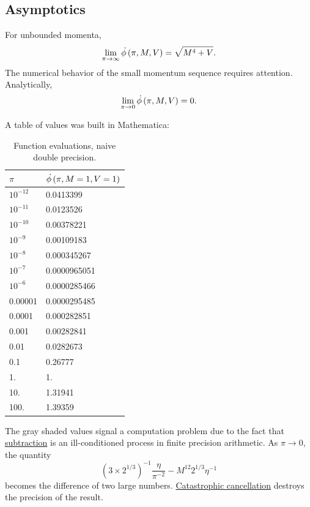 \documentclass[11pt, oneside]{article}   	%
\newcommand{\pd}[0]				   {\skew{6}{\dot}{\phi}}
\newcommand{\phidot}[0]      {\pd\left( \pi, M, V \right)}
\begin{document}
\subsection{Asymptotics}
For unbounded momenta,
  \begin{equation}   %
    \lim_{\pi\to\infty} \phidot = \sqrt{M^{4}+V}.
  \end{equation}
The numerical behavior of the small momentum sequence requires attention. Analytically,
  \begin{equation}   %
    \lim_{\pi\to 0} \phidot = 0.
  \end{equation}

A table of values was built in Mathematica:
\begin{table}[htbp]
  \caption{Function evaluations, naive double precision.}
  \begin{center}
    \begin{tabular}{ll}
       $\pi$ & $\pd\left( \pi, M = 1, V = 1 \right)$ \\\hline
       \color{mygray} $10^{-12}$ & \color{mygray} 0.0413399 \\
       \color{mygray} $10^{-11}$ & \color{mygray} 0.0123526 \\
       \color{mygray} $10^{-10}$ & \color{mygray} 0.00378221 \\
       \color{mygray} $10^{-9}$  & \color{mygray} 0.00109183 \\
       \color{mygray} $10^{-8}$  & \color{mygray} 0.000345267 \\
       \color{mygray} $10^{-7}$  & \color{mygray} 0.0000965051 \\
       \color{mygray} $10^{-6}$  & \color{mygray} 0.0000285466 \\
       0.00001 & 0.0000295485 \\
       0.0001 & 0.000282851 \\
       0.001 & 0.00282841 \\
       0.01 & 0.0282673 \\
       0.1 & 0.26777 \\
       1. & 1. \\
       10. & 1.31941 \\
       100. & 1.39359 \\
    \end{tabular}
  \end{center}
  \label{tab:data}
\end{table}%
The gray shaded values signal a computation problem due to the fact that \href{https://en.wikipedia.org/wiki/Loss_of_significance}{subtraction} is an ill-conditioned process in finite precision arithmetic. As $\pi\to0$, the quantity
$$ \left( 3\times 2^{1/3} \right)^{-1} \frac{\eta }{\pi^{-2}} - M^{12} 2^{1/3} \eta^{-1}$$
becomes the difference of two large numbers. \href{https://math.stackexchange.com/questions/1920525/why-is-catastrophic-cancellation-called-so}{Catastrophic cancellation} destroys the precision of the result.
\end{document}
